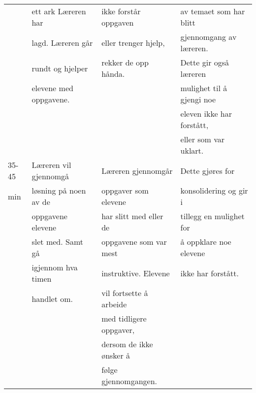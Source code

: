 \documentclass[11pt]{article}
\begin{document}
\begin{center}
\begin{tabular}{l|l|l|l}
 & ett ark Læreren har & ikke forstår oppgaven & av temaet som har blitt\\
 & lagd. Læreren går & eller trenger hjelp, & gjennomgang av læreren.\\
 & rundt og hjelper & rekker de opp hånda. & Dette gir også læreren\\
 & elevene med oppgavene. &  & mulighet til å gjengi noe\\
 &  &  & eleven ikke har forstått,\\
 &  &  & eller som  var uklart.\\
\hline
35-45 & Læreren vil gjennomgå & Læreren gjennomgår & Dette gjøres for\\
min & løsning på noen av de & oppgaver som elevene & konsolidering og gir i\\
 & oppgavene elevene & har slitt med eller de & tillegg en mulighet for\\
 & slet med. Samt gå & oppgavene som var mest & å oppklare noe elevene\\
 & igjennom hva timen & instruktive. Elevene & ikke har forstått.\\
 & handlet om. & vil fortsette å arbeide & \\
 &  & med tidligere oppgaver, & \\
 &  & dersom de ikke ønsker å & \\
 &  & følge gjennomgangen. & \\
\end{tabular}
\end{center}
\newpage
\end{document}
